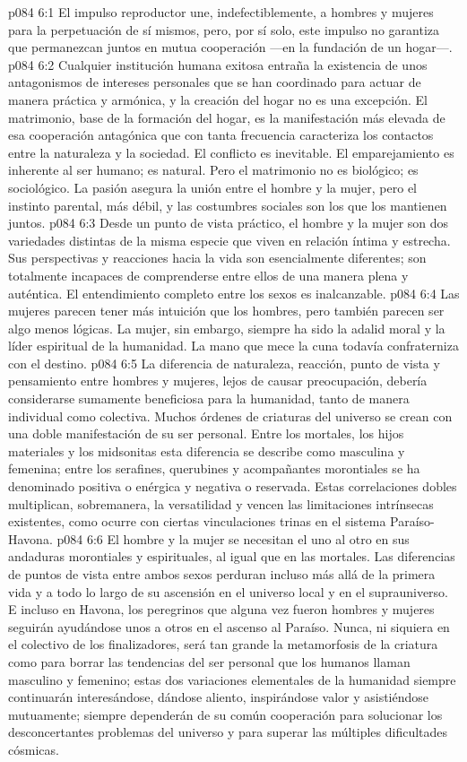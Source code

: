 \vs p084 6:1 El impulso reproductor une, indefectiblemente, a hombres y mujeres para la perpetuación de sí mismos, pero, por sí solo, este impulso no garantiza que permanezcan juntos en mutua cooperación ---en la fundación de un hogar---.
\vs p084 6:2 Cualquier institución humana exitosa entraña la existencia de unos antagonismos de intereses personales que se han coordinado para actuar de manera práctica y armónica, y la creación del hogar no es una excepción. El matrimonio, base de la formación del hogar, es la manifestación más elevada de esa cooperación antagónica que con tanta frecuencia caracteriza los contactos entre la naturaleza y la sociedad. El conflicto es inevitable. El emparejamiento es inherente al ser humano; es natural. Pero el matrimonio no es biológico; es sociológico. La pasión asegura la unión entre el hombre y la mujer, pero el instinto parental, más débil, y las costumbres sociales son los que los mantienen juntos.
\vs p084 6:3 \pc Desde un punto de vista práctico, el hombre y la mujer son dos variedades distintas de la misma especie que viven en relación íntima y estrecha. Sus perspectivas y reacciones hacia la vida son esencialmente diferentes; son totalmente incapaces de comprenderse entre ellos de una manera plena y auténtica. El entendimiento completo entre los sexos es inalcanzable.
\vs p084 6:4 Las mujeres parecen tener más intuición que los hombres, pero también parecen ser algo menos lógicas. La mujer, sin embargo, siempre ha sido la adalid moral y la líder espiritual de la humanidad. La mano que mece la cuna todavía confraterniza con el destino.
\vs p084 6:5 \pc La diferencia de naturaleza, reacción, punto de vista y pensamiento entre hombres y mujeres, lejos de causar preocupación, debería considerarse sumamente beneficiosa para la humanidad, tanto de manera individual como colectiva. Muchos órdenes de criaturas del universo se crean con una doble manifestación de su ser personal. Entre los mortales, los hijos materiales y los midsonitas esta diferencia se describe como masculina y femenina; entre los serafines, querubines y acompañantes morontiales se ha denominado positiva o enérgica y negativa o reservada. Estas correlaciones dobles multiplican, sobremanera, la versatilidad y vencen las limitaciones intrínsecas existentes, como ocurre con ciertas vinculaciones trinas en el sistema Paraíso\hyp{}Havona.
\vs p084 6:6 El hombre y la mujer se necesitan el uno al otro en sus andaduras morontiales y espirituales, al igual que en las mortales. Las diferencias de puntos de vista entre ambos sexos perduran incluso más allá de la primera vida y a todo lo largo de su ascensión en el universo local y en el suprauniverso. E incluso en Havona, los peregrinos que alguna vez fueron hombres y mujeres seguirán ayudándose unos a otros en el ascenso al Paraíso. Nunca, ni siquiera en el colectivo de los finalizadores, será tan grande la metamorfosis de la criatura como para borrar las tendencias del ser personal que los humanos llaman masculino y femenino; estas dos variaciones elementales de la humanidad siempre continuarán interesándose, dándose aliento, inspirándose valor y asistiéndose mutuamente; siempre dependerán de su común cooperación para solucionar los desconcertantes problemas del universo y para superar las múltiples dificultades cósmicas.
